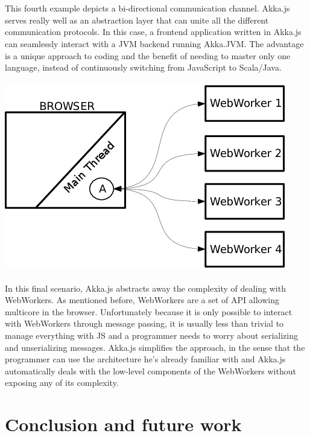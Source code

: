 \documentclass{sig-alternate}
\begin{document}
\\\\
This fourth example depicts a bi-directional communication channel. Akka.js serves really well as an abstraction layer
that can unite all the different communication protocols. In this case, a frontend application written in Akka.js
can seamlessly interact with a JVM backend running Akka.JVM. The advantage is a unique approach to coding and 
the benefit of needing to master only one language, instead of continuously switching from JavaScript to Scala/Java.
\\\\
\includegraphics[scale=0.5]{5.png}
\\\\
In this final scenario, Akka.js abstracts away the complexity of dealing with WebWorkers. As mentioned before, WebWorkers
are a set of API allowing multicore in the browser. Unfortunately because it is only possible to interact with WebWorkers 
through message passing, it is usually less than trivial to manage everything with JS and a programmer needs to worry
about serializing and unserializing messages. Akka.js simplifies the approach, in the sense that the programmer can use
the architecture he's already familiar with and Akka.js automatically deals with the low-level components of the WebWorkers
without exposing any of its complexity.

\section{Conclusion and future work}\label{sec:conclusion}
\end{document}
